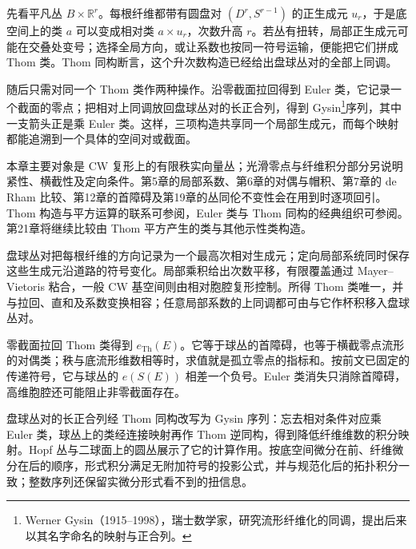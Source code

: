 \ProseParagraphBreak

先看平凡丛 \(B\times\mathbb R^r\)。每根纤维都带有圆盘对 \((D^r,S^{r-1})\) 的正生成元 \(u_r\)，于是底空间上的类 \(a\) 可以变成相对类 \(a\times u_r\)，次数升高 \(r\)。若丛有扭转，局部正生成元可能在交叠处变号；选择全局方向，或让系数也按同一符号运输，便能把它们拼成 Thom 类。Thom 同构断言，这个升次数构造已经给出盘球丛对的全部上同调。

\ProseParagraphBreak

随后只需对同一个 Thom 类作两种操作。沿零截面拉回得到 Euler 类，它记录一个截面的零点；把相对上同调放回盘球丛对的长正合列，得到 Gysin\footnote{Werner Gysin（1915--1998），瑞士数学家，研究流形纤维化的同调，提出后来以其名字命名的映射与正合列。}序列，其中一支箭头正是乘 Euler 类。这样，三项构造共享同一个局部生成元，而每个映射都能追溯到一个具体的空间对或截面。

\ProseParagraphBreak

本章主要对象是 CW 复形上的有限秩实向量丛；光滑零点与纤维积分部分另说明紧性、横截性及定向条件。第5章的局部系数、第6章的对偶与帽积、第7章的 de Rham 比较、第12章的首障碍及第19章的丛同伦不变性会在用到时逐项回引。Thom 构造与平方运算的联系可参阅\cite[第23章第5--6节]{May1999}，Euler 类与 Thom 同构的经典组织可参阅\cite[第9节，Oriented Bundles and the Euler Class；第10节，The Thom Isomorphism Theorem]{MilnorStasheff1974}。第21章将继续比较由 Thom 平方产生的类与其他示性类构造。






\begin{chaptersummary}
	盘球丛对把每根纤维的方向记录为一个最高次相对生成元；定向局部系统同时保存这些生成元沿道路的符号变化。局部乘积给出次数平移，有限覆盖通过 Mayer--Vietoris 粘合，一般 CW 基空间则由相对胞腔复形控制。所得 Thom 类唯一，并与拉回、直和及系数变换相容；任意局部系数的上同调都可由与它作杯积移入盘球丛对。

	\ProseParagraphBreak

	零截面拉回 Thom 类得到 \(e_{\mathrm{Th}}(E)\)。它等于球丛的首障碍，也等于横截零点流形的对偶类；秩与底流形维数相等时，求值就是孤立零点的指标和。按前文已固定的传递符号，它与球丛的 \(e(S(E))\) 相差一个负号。Euler 类消失只消除首障碍，高维胞腔还可能阻止非零截面存在。

	\ProseParagraphBreak

	盘球丛对的长正合列经 Thom 同构改写为 Gysin 序列：忘去相对条件对应乘 Euler 类，球丛上的类经连接映射再作 Thom 逆同构，得到降低纤维维数的积分映射。Hopf 丛与二球面上的圆丛展示了它的计算作用。按底空间微分在前、纤维微分在后的顺序，形式积分满足无附加符号的投影公式，并与规范化后的拓扑积分一致；整数序列还保留实微分形式看不到的扭信息。
\end{chaptersummary}

